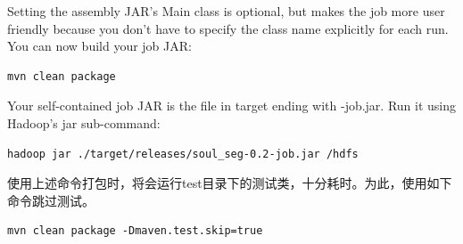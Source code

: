 \par Setting the assembly JAR's Main class is optional, but makes the job more user friendly because you don’t have to specify the class name explicitly for each run. You can now build your job JAR:
\begin{verbatim}
mvn clean package
\end{verbatim}
\par Your self-contained job JAR is the file in target ending with -job.jar. Run it using Hadoop’s jar sub-command: 
\begin{verbatim}
hadoop jar ./target/releases/soul_seg-0.2-job.jar /hdfs
\end{verbatim}
\par 使用上述命令打包时，将会运行test目录下的测试类，十分耗时。为此，使用如下命令跳过测试。
\begin{verbatim}
mvn clean package -Dmaven.test.skip=true
\end{verbatim}
